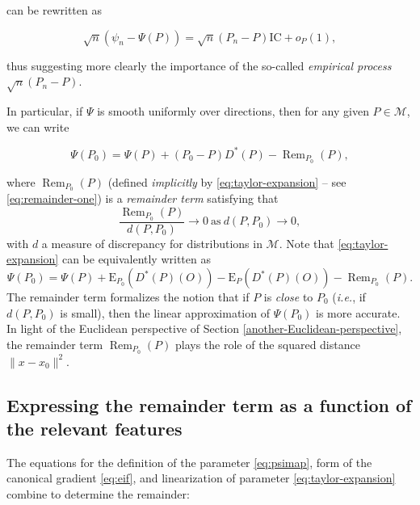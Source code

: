 \documentclass[
  11pt,
  openright,twoside]{book}
\DeclareMathOperator{\Rem}{Rem}
\newcommand{\calM}{\mathcal{M}}
\newcommand{\Exp}{\textrm{E}}
\newcommand{\IC}{\textrm{IC}}
\theoremstyle{definition}
\theoremstyle{definition}
\theoremstyle{definition}
\theoremstyle{definition}
\theoremstyle{remark}
\begin{document}
can be rewritten as

\begin{equation*}
\sqrt{n} (\psi_n - \Psi(P)) = \sqrt{n} (P_{n} - P) \IC + o_P(1),
\end{equation*}

thus suggesting more clearly the importance of the so-called \emph{empirical
process} \(\sqrt{n} (P_{n} - P)\).

In particular, if \(\Psi\) is smooth uniformly over directions, then for any
given \(P \in \calM\), we can write

\begin{equation} 
\Psi(P_0)    =   \Psi(P)    +   (P_0    -   P)    D^*(P)   -    \Rem_{P_0}(P),
\label{eq:taylor-expansion} 
\end{equation}

where \(\Rem_{P_0}(P)\) (defined \emph{implicitly} by \eqref{eq:taylor-expansion} --
see \eqref{eq:remainder-one}) is a
\emph{remainder term} satisfying that \begin{equation*} \frac{\Rem_{P_0}(P)}{d(P,
P_0)} \rightarrow  0 \ \mbox{as} \  d(P, P_0) \rightarrow 0  , \end{equation*}
with \(d\) a measure of discrepancy for distributions in \(\calM\). Note that
\eqref{eq:taylor-expansion} can be equivalently written as \begin{equation*}
\Psi(P_0)   =   \Psi(P)   +  \Exp_{P_0}(D^*(P)(O))   -   \Exp_P(D^*(P)(O))   -
\Rem_{P_0}(P).  \end{equation*} The remainder term formalizes the notion that
if \(P\) is \emph{close} to \(P_0\) (\emph{i.e.}, if \(d(P,P_0)\) is small), then the linear
approximation of \(\Psi(P_0)\) is more accurate. In light of
the Euclidean perspective of Section \ref{another-Euclidean-perspective}, the
remainder term \(\Rem_{P_0}(P)\) plays the role of the squared distance \(\|x-x_0\|^{2}\).

\hypertarget{expressing-the-remainder-term-as-a-function-of-the-relevant-features}{%
\subsection{Expressing the remainder term as a function of the relevant features}\label{expressing-the-remainder-term-as-a-function-of-the-relevant-features}}

The equations for the definition of the parameter \eqref{eq:psimap}, form of
the canonical gradient \eqref{eq:eif}, and linearization of parameter
\eqref{eq:taylor-expansion} combine to determine the remainder:
\end{document}
